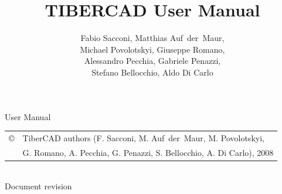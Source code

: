 \documentclass[12pt,            %
               a4paper,         %
               twoside,         %
               pdftex
               ]{book}
\newcommand{\TiberCAD}{{{T{\scriptsize IBER}CAD}}}
\newcommand{\clear}{\newpage}
\newcommand{\clear}{\newpage{\pagestyle{empty}\cleardoublepage}}
\theoremstyle{plain}
\begin{document}
\ifpdf
\else
\fi



\title{T{\large IBER}CAD User Manual}
\author{Fabio Sacconi, Matthias Auf~der~Maur, \\ Michael Povolotskyi, Giuseppe Romano, \\ Alessandro Pecchia, Gabriele Penazzi, \\
Stefano  Bellocchio,  Aldo Di Carlo} 
\maketitle


\thispagestyle{empty}
\vspace*{\textheight}
\vspace{-3cm}
\noindent\TiberCAD{} User Manual \smallskip \smallskip \\
\begin{tabular}{@{}l@{ }l}
\copyright & TiberCAD authors (F. Sacconi, M. Auf~der~Maur, M. Povolotskyi, \\
 & G. Romano, A. Pecchia, G. Penazzi, S. Bellocchio, A. Di Carlo), 2008
\end{tabular} \smallskip \smallskip \\
Document revision 


\clear
\setcounter{page}{1}

\ifpdf{}\fi
{}
\tableofcontents

\clear



                               



\clear
{}

\clear

\clear

\clear

\clear

\clear

\clear

\clear

\clear





\ifpdf{}\fi
{}


\end{document}
